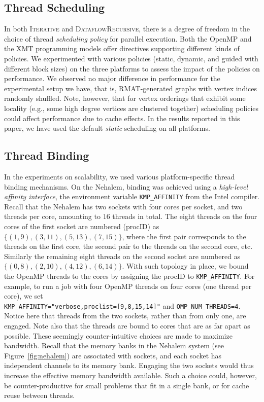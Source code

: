 \documentclass{article}
\begin{document}
\subsection{Thread Scheduling}
\label{sec:scheduling}

In both \textsc{Iterative} and \textsc{DataflowRecursive}, 
there is a degree of freedom in the choice
of thread {\em scheduling policy} for parallel execution.  
Both the OpenMP and the XMT programming models offer directives 
supporting different kinds of policies.
We experimented with  various policies (static,
dynamic, and guided with different block sizes)
on the three platforms to assess the impact of the policies on performance. 
We observed no major difference in performance for the experimental setup 
we have, that is, RMAT-generated graphs with vertex indices randomly shuffled.
Note, however, that for vertex orderings that exhibit
some locality (e.g., some high degree vertices are clustered together) 
scheduling policies could
affect performance due to  cache effects.
In the results reported in this paper, we have used the default {\em static} 
scheduling on all platforms.

\subsection{Thread Binding}
\label{sec:binding}

In the experiments on scalability, we used various platform-specific thread binding mechanisms.    
On the Nehalem, binding  was achieved using a {\em high-level affinity interface},
the environment variable \texttt{KMP\_AFFINITY} from the Intel compiler. 
Recall that the Nehalem has two sockets with four cores per socket, and
two threads per core, amounting to $16$ threads in total. 
The eight threads on the four cores of the first socket are
numbered (procID) as 
$\{(1, 9), (3, 11), (5, 13), (7, 15)\}$, 
where the first pair corresponds to the threads
on the first core, the second pair to the threads on the second core, etc.
Similarly the remaining eight  threads on the second socket are numbered as
 $\{(0, 8), (2, 10), (4, 12), (6, 14)\}$.
With such topology in place, we bound the OpenMP threads to the cores by
assigning the procID to \texttt{KMP\_AFFINITY}. For example, 
to run a job with four OpenMP threads on four cores (one thread per core), we set \\
 \texttt{KMP\_AFFINITY="verbose,proclist=[9,8,15,14]"} 
and \texttt{OMP\_NUM\_THREADS=4}.\\
Notice here that threads from the two sockets, rather than from
only one, are engaged. Note also that the threads are bound to cores that are as far apart as possible.
These seemingly counter-intuitive choices are made to maximize bandwidth.
Recall that the memory banks in the Nehalem system (see Figure~\ref{fig:nehalem}) 
are associated with sockets, and each socket has independent channels to its memory bank. 
Engaging the two sockets would thus increase the effective memory bandwidth available. 
Such a choice could, however, be counter-productive for small problems that fit in a single bank, 
or for cache reuse between threads. 
\end{document}
